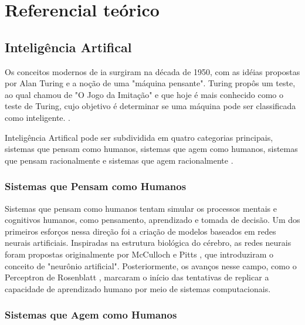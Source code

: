 \chapter{Referencial te\'orico}\label{cap:referencialTeorico}

\section{Inteligência Artifical}\label{sec:ia}

Os conceitos modernos de \gls{ia} surgiram na década de 1950, com as idéias propostas por Alan Turing e a noção de uma "máquina pensante". Turing propôs um teste, ao qual chamou de "O Jogo da Imitação" e que hoje é mais conhecido como o teste de Turing, cujo objetivo é determinar se uma máquina pode ser classificada como inteligente. \cite{Turing1950}.

Inteligência Artifical pode ser subdividida em quatro categorias principais, sistemas que pensam como humanos, sistemas que agem como humanos, sistemas que pensam racionalmente e sistemas que agem racionalmente \cite{RussellIA2021}.

\subsection{Sistemas que Pensam como Humanos}\label{subsec:ia1}

Sistemas que pensam como humanos tentam simular os processos mentais e cognitivos humanos, como pensamento, aprendizado e tomada de decisão. Um dos primeiros esforços nessa direção foi a criação de modelos baseados em redes neurais artificiais. Inspiradas na estrutura biológica do cérebro, as redes neurais foram propostas originalmente por McCulloch e Pitts \cite{McCulloch1943}, que introduziram o conceito de "neurônio artificial". Posteriormente, os avanços nesse campo, como o Perceptron de Rosenblatt \cite{Rosenblatt1958}, marcaram o início das tentativas de replicar a capacidade de aprendizado humano por meio de sistemas computacionais.

\subsection{Sistemas que Agem como Humanos}\label{subsec:ia2}


